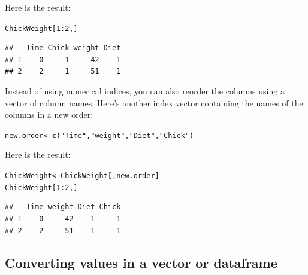 \documentclass{tufte-book}\usepackage[]{graphicx}\usepackage[]{color}
\makeatletter
\newcommand{\hlnum}[1]{\textcolor[rgb]{0.686,0.059,0.569}{#1}}%
\newcommand{\hlstr}[1]{\textcolor[rgb]{0.192,0.494,0.8}{#1}}%
\newcommand{\hlopt}[1]{\textcolor[rgb]{0,0,0}{#1}}%
\newcommand{\hlstd}[1]{\textcolor[rgb]{0.345,0.345,0.345}{#1}}%
\newcommand{\hlkwb}[1]{\textcolor[rgb]{0.69,0.353,0.396}{#1}}%
\newcommand{\hlkwd}[1]{\textcolor[rgb]{0.737,0.353,0.396}{\textbf{#1}}}%
\newenvironment{kframe}{%
 \def\at@end@of@kframe{}%
 \ifinner\ifhmode%
  \def\at@end@of@kframe{\end{minipage}}%
  \begin{minipage}{\columnwidth}%
 \fi\fi%
 \def\FrameCommand##1{\hskip\@totalleftmargin \hskip-\fboxsep
 \colorbox{shadecolor}{##1}\hskip-\fboxsep
     \hskip-\linewidth \hskip-\@totalleftmargin \hskip\columnwidth}%
 \MakeFramed {\advance\hsize-\width
   \@totalleftmargin\z@ \linewidth\hsize
   \@setminipage}}%
 {\par\unskip\endMakeFramed%
 \at@end@of@kframe}
\newenvironment{knitrout}{}{} %
\makeatother
\begin{document}
Here is the result:

\begin{knitrout}
\color{fgcolor}\begin{kframe}
\begin{alltt}
\hlstd{ChickWeight[}\hlnum{1}\hlopt{:}\hlnum{2}\hlstd{,]}
\end{alltt}
\begin{verbatim}
##   Time Chick weight Diet
## 1    0     1     42    1
## 2    2     1     51    1
\end{verbatim}
\end{kframe}
\end{knitrout}

Instead of using numerical indices, you can also reorder the columns using a vector of column names. Here's another index vector containing the names of the columns in a new order:

\begin{knitrout}
\color{fgcolor}\begin{kframe}
\begin{alltt}
\hlstd{new.order} \hlkwb{<-} \hlkwd{c}\hlstd{(}\hlstr{"Time"}\hlstd{,} \hlstr{"weight"}\hlstd{,} \hlstr{"Diet"}\hlstd{,} \hlstr{"Chick"}\hlstd{)}
\end{alltt}
\end{kframe}
\end{knitrout}

Here is the result:

\begin{knitrout}
\color{fgcolor}\begin{kframe}
\begin{alltt}
\hlstd{ChickWeight} \hlkwb{<-} \hlstd{ChickWeight[,new.order]}
\hlstd{ChickWeight[}\hlnum{1}\hlopt{:}\hlnum{2}\hlstd{,]}
\end{alltt}
\begin{verbatim}
##   Time weight Diet Chick
## 1    0     42    1     1
## 2    2     51    1     1
\end{verbatim}
\end{kframe}
\end{knitrout}



\pagebreak
\subsection{Converting values in a vector or dataframe}
\end{document}
